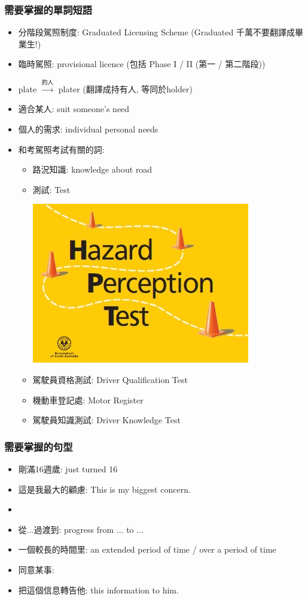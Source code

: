 \subsubsection*{需要掌握的單詞短語}
\begin{itemize}
  \itemsep0em
  \item 分階段駕照制度: Graduated Licensing Scheme (Graduated 千萬不要翻譯成畢業生!)
  \item 臨時駕照: provisional licence (包括 Phase I / II (第一 / 第二階段))
  \item plate $\xrightarrow{\text{的人}}$ plater (翻譯成持有人, 等同於holder)
  \item 適合某人: suit someone's need
  \item 個人的需求: individual personal needs
  \item 和考駕照考試有關的詞:
  \begin{itemize}
  \itemsep0em
    \item 路況知識: knowledge about road
    \item {}測試:  Test
    \begin{center}
      \includegraphics[scale=.5]{pics/hpt}
    \end{center}
    \item 駕駛員資格測試: Driver Qualification Test
    \item 機動車登記處: Motor Register
    \item 駕駛員知識測試: Driver Knowledge Test
  \end{itemize}
\end{itemize}

\subsubsection*{需要掌握的句型}
\begin{itemize}
  \itemsep0em
  \item 剛滿16週歲: just turned 16
  \item 這是我最大的顧慮: This is my biggest concern.
  \item {}
  \item 從...過渡到: progress from ... to ...
  \item 一個較長的時間里: an extended period of time / over a period of time
  \item 同意某事: 
  \item 把這個信息轉告他:  this information to him.
\end{itemize}

